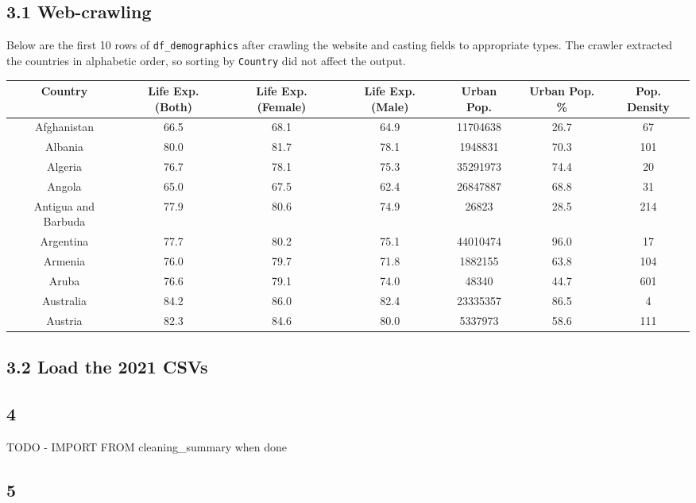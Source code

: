 \documentclass[14pt]{extarticle}
\begin{document}
\subsection*{3.1 Web-crawling}
Below are the first 10 rows of \texttt{df\_demographics} after crawling the website
and casting fields to appropriate types. The crawler extracted the countries in alphabetic order,
so sorting by \texttt{Country} did not affect the output.

{\scriptsize
\begin{center}
\begin{tabular}{ |c|c|c|c|c|c|c| }
  \hline
  Country&Life Exp. (Both)&Life Exp. (Female)&Life Exp. (Male)&Urban Pop.&Urban Pop. \%&Pop. Density\\
  \hline
  Afghanistan&66.5&68.1&64.9&11704638&26.7&67\\
  Albania&80.0&81.7&78.1&1948831&70.3&101\\
  Algeria&76.7&78.1&75.3&35291973&74.4&20\\
  Angola&65.0&67.5&62.4&26847887&68.8&31\\
  Antigua and Barbuda&77.9&80.6&74.9&26823&28.5&214\\
  Argentina&77.7&80.2&75.1&44010474&96.0&17\\
  Armenia&76.0&79.7&71.8&1882155&63.8&104\\
  Aruba&76.6&79.1&74.0&48340&44.7&601\\
  Australia&84.2&86.0&82.4&23335357&86.5&4\\
  Austria&82.3&84.6&80.0&5337973&58.6&111\\
  \hline
\end{tabular}
\end{center}}

\subsection*{3.2 Load the 2021 CSVs}
\subsection*{4}
TODO - IMPORT FROM cleaning_summary when done
\subsection*{5}
\end{document}
